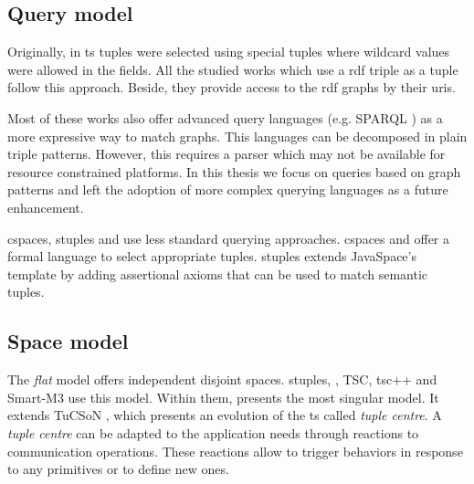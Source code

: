 


\subsection{Query model}

Originally, in \ac{ts} tuples were selected using special tuples where wildcard values were allowed in the fields. %
All the studied works which use a \ac{rdf} triple as a tuple follow this approach.
Beside, they provide access to the \ac{rdf} graphs by their \acp{uri}.

Most of these works also offer advanced query languages (e.g. SPARQL ) as a more expressive way to match graphs.
This languages can be decomposed in plain triple patterns.
However, this requires a parser which may not be available for resource constrained platforms.
In this thesis we focus on queries based on graph patterns and left the adoption of more complex querying languages as a future enhancement.

\ac{cspaces}, \ac{stuples} and \citeauthor{nardini_semantic_2013} use less standard querying approaches.
\ac{cspaces} \citep{martinrecuerda_towards_2005} and \citet{nardini_semantic_2013} offer a formal language to select appropriate tuples.
\ac{stuples}\citep{khushraj_stuples:_2004} extends JavaSpace's template by adding assertional axioms that can be used to match semantic tuples.




\subsection{Space model}
\label{sec:soa_tsc_space}

The \emph{flat} model offers independent disjoint spaces.
\ac{stuples}, \citet{nardini_semantic_2013}, TSC, tsc++ and Smart-M3 use this model.
Within them, \citet{nardini_semantic_2013} presents the most singular model.
It extends TuCSoN \cite{omicini_tucson:_1998}, which presents an evolution of the \ac{ts} called \emph{tuple centre}.
A \emph{tuple centre} can be adapted to the application needs through reactions to communication operations.
These reactions allow to trigger behaviors in response to any primitives or to define new ones.


